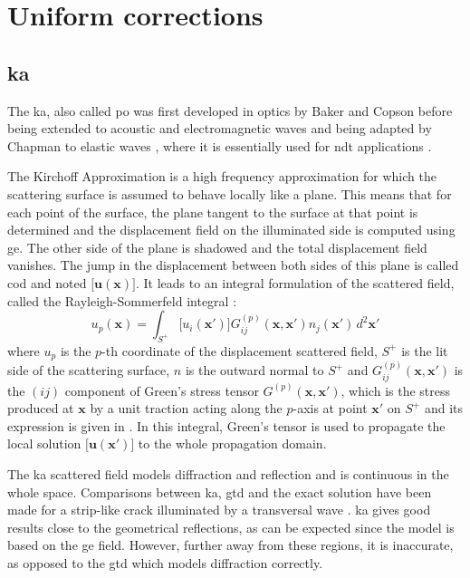 \section{Uniform corrections}
\label{sectUnif}
\subsection{\acrfull{ka}}
\label{sectKA}
The \acrfull{ka}, also called \acrfull{po} was first developed in optics by Baker and Copson \cite{POoptics} before being extended to acoustic and electromagnetic waves \cite{POtechreport, POLewis} and being adapted by Chapman to elastic waves \cite{POChapman}, where it is essentially used for \acrshort{ndt} applications \cite{Schmerr,Dorval}.

The Kirchoff Approximation is a high frequency approximation for which the scattering surface is assumed to behave locally like a plane. This means that for each point of the surface, the plane tangent to the surface at that point is determined and the displacement field on the illuminated side is computed using \acrshort{ge}. The other side of the plane is shadowed and the total displacement field vanishes. The jump in the displacement between both sides of this plane is called \acrfull{cod} and noted $\lbrack \mathbf{u}(\mathbf{x}) \rbrack$. It leads to an integral formulation of the scattered field, called the Rayleigh-Sommerfeld integral \cite{POChapman} :
\begin{equation}
u_p(\mathbf{x})=\int_{S^+}\lbrack u_i(\mathbf{x'})\rbrack G_{ij}^{(p)}(\mathbf{x},\mathbf{x'})n_j(\mathbf{x'})\,d^2\mathbf{x'}
\label{intKA}
\end{equation}
where $u_p$ is the $p$-th coordinate of the displacement scattered field, $S^+$ is the lit side of the scattering surface, $n$ is the outward normal to $S^+$ and $G_{ij}^{(p)}(\mathbf{x},\mathbf{x'})$ is the $(ij)$ component of Green's stress tensor $G^{(p)}(\mathbf{x},\mathbf{x'})$, which is the stress produced at $\mathbf{x}$ by a unit traction acting along the $p$-axis at point $\mathbf{x'}$ on $S^+$ and its expression is given in \cite{POChapman}. In this integral, Green's tensor is used to propagate the local solution $\lbrack \mathbf{u}(\mathbf{x'}) \rbrack$ to the whole propagation domain.

The \acrshort{ka} scattered field models diffraction and reflection and is continuous in the whole space. Comparisons between \acrshort{ka}, \acrshort{gtd} and the exact solution have been made for a strip-like crack illuminated by a transversal wave \cite{POChapman,systmodel}. \acrshort{ka} gives good results close to the geometrical reflections, as can be expected since the model is based on the \acrshort{ge} field. However, further away from these regions, it is inaccurate, as opposed to the \acrshort{gtd} which models diffraction correctly.

